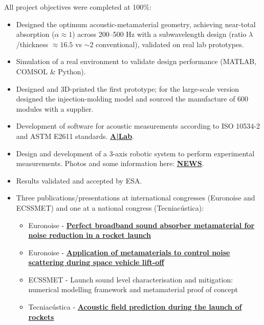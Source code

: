 \documentclass[10pt,a4paper,ragged2e,normalphoto,withhyper]{altacv}
\begin{document}
\begin{minipage}{\linewidth}
\begin{justify}
\noindent All project objectives were completed at 100\%:
\end{justify}
\begin{itemize}
	\item Designed the optimum acoustic-metamaterial geometry, achieving near-total absorption ($\alpha \approx 1$) across 200--500 Hz with a subwavelength design (ratio $\lambda$/thickness $\approx 16.5$ vs $\sim$2 conventional), validated on real lab prototypes.
	\item Simulation of a real environment to validate design performance (MATLAB, COMSOL \& Python).
	\item Designed and 3D-printed the first prototype; for the large-scale version designed the injection-molding model and sourced the manufacture of 600 modules with a supplier.
	\item Development of software for acoustic measurements according to ISO 10534-2 and ASTM E2611 standards. \href{https://github.com/jmrplens/A-Lab}{\bf A|Lab}.
	\item Design and development of a 3-axis robotic system to perform experimental measurements. Photos and some information here: \href{https://cienciagandia.webs.upv.es/en/2022/03/metamaterial-to-reduce-noise-in-space-rocket-launches/}{\bf NEWS}.
	\item Results validated and accepted by ESA.
	\item Three publications/presentations at international congresses (Euronoise and ECSSMET) and one at a national congress (Tecniacústica):
	\begin{itemize}\setlength\itemsep{0em}
	\item Euronoise - \href{https://jmrp.io/pdf/paper-resources/Conferences/Euronoise/plensEuro2021.pdf}{\bf Perfect broadband sound absorber metamaterial for noise reduction in a rocket launch} 
	\item Euronoise - \href{https://jmrp.io/pdf/paper-resources/Conferences/Euronoise/EscartiEuro2021.pdf}{\bf Application of metamaterials to control noise scattering during space vehicle lift-off}
	\item ECSSMET - Launch sound level characterisation and mitigation: numerical modelling framework and metamaterial proof of concept
	\item Tecniacústica - \href{https://jmrp.io/pdf/paper-resources/Conferences/Tecniacustica/plensTEC2020.pdf}{\bf Acoustic field prediction during the launch of rockets}
	\end{itemize}
	
\end{itemize}
\end{minipage}
\vspace{0.5em}
\end{document}
